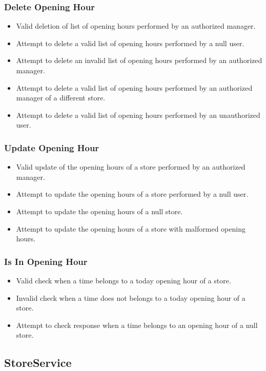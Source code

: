 \subsubsection{Delete Opening Hour}
\begin{itemize}
	\item Valid deletion of list of opening hours performed by an authorized manager.
	\item Attempt to delete a valid list of opening hours performed by a null user.
	\item Attempt to delete an invalid list of opening hours performed by an authorized manager.
	\item Attempt to delete a valid list of opening hours performed by an authorized manager of a different store.
	\item Attempt to delete a valid list of opening hours performed by an unauthorized user.
\end{itemize}

\subsubsection{Update Opening Hour}
\begin{itemize}
	\item Valid update of the opening hours of a store performed by an authorized manager.
	\item Attempt to update the opening hours of a store performed by a null user.
	\item Attempt to update the opening hours of a null store.
	\item Attempt to update the opening hours of a store with malformed opening hours.
\end{itemize}

\subsubsection{Is In Opening Hour}
\begin{itemize}
	\item Valid check when a time belongs to a today opening hour of a store.
	\item Invalid check when a time does not belongs to a today opening hour of a store.
	\item Attempt to check response when a time belongs to an opening hour of a null store.
\end{itemize}

\subsection{StoreService}

